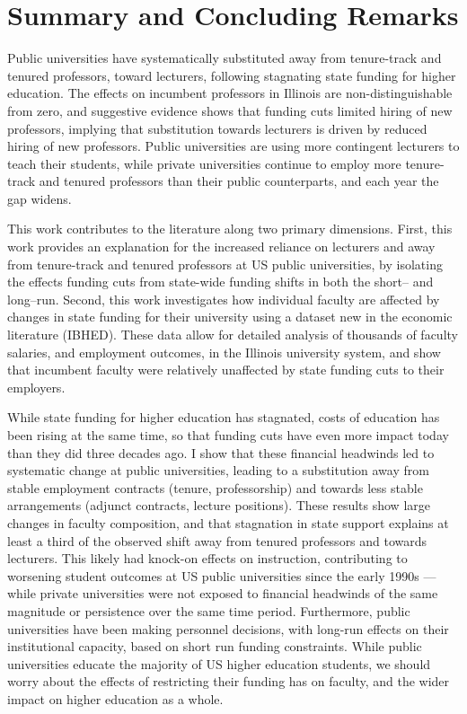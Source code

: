 \section{Summary and Concluding Remarks}
\label{sec:conclusion}
Public universities have systematically substituted away from tenure-track and tenured professors, toward lecturers, following stagnating state funding for higher education.
The effects on incumbent professors in Illinois are non-distinguishable from zero, and suggestive evidence shows that funding cuts limited hiring of new professors, implying that substitution towards lecturers is driven by reduced hiring of new professors.
Public universities are using more contingent lecturers to teach their students, while private universities continue to employ more tenure-track and tenured professors than their public counterparts, and each year the gap widens.

This work contributes to the literature along two primary dimensions.
First, this work provides an explanation for the increased reliance on lecturers and away from tenure-track and tenured professors at US public universities, by isolating the effects funding cuts from state-wide funding shifts in both the short-- and long--run.
Second, this work investigates how individual faculty are affected by changes in state funding for their university using a dataset new in the economic literature (IBHED).
These data allow for detailed analysis of thousands of faculty salaries, and employment outcomes, in the Illinois university system, and show that incumbent faculty were relatively unaffected by state funding cuts to their employers.

While state funding for higher education has stagnated, costs of education has been rising at the same time, so that funding cuts have even more impact today than they did three decades ago.
I show that these financial headwinds led to systematic change at public universities, leading to a substitution away from stable employment contracts (tenure, professorship) and towards less stable arrangements (adjunct contracts, lecture positions).
These results show large changes in faculty composition, and that stagnation in state support explains at least a third of the observed shift away from tenured professors and towards lecturers.
This likely had knock-on effects on instruction, contributing to worsening student outcomes at US public universities since the early 1990s --- while private universities were not exposed to financial headwinds of the same magnitude or persistence over the same time period.
Furthermore, public universities have been making personnel decisions, with long-run effects on their institutional capacity, based on short run funding constraints.
While public universities educate the majority of US higher education students, we should worry about the effects of restricting their funding has on faculty, and the wider impact on higher education as a whole.
